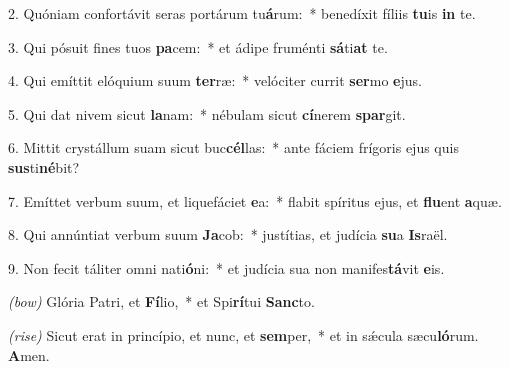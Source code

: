 2. Quóniam confortávit seras portárum tu\textbf{á}rum:~* benedíxit fíliis \textbf{tu}is \textbf{in} te.

3. Qui pósuit fines tuos \textbf{pa}cem:~* et ádipe fruménti \textbf{sá}ti\textbf{at} te.

4. Qui emíttit elóquium suum \textbf{ter}ræ:~* velóciter currit \textbf{ser}mo \textbf{e}jus.

5. Qui dat nivem sicut \textbf{la}nam:~* nébulam sicut \textbf{cí}nerem \textbf{spar}git.

6. Mittit crystállum suam sicut buc\textbf{cél}las:~* ante fáciem frígoris ejus quis \textbf{sus}ti\textbf{né}bit?

7. Emíttet verbum suum, et liquefáciet \textbf{e}a:~* flabit spíritus ejus, et \textbf{flu}ent \textbf{a}quæ.

8. Qui annúntiat verbum suum \textbf{Ja}cob:~* justítias, et judícia \textbf{su}a \textbf{Is}raël.

9. Non fecit táliter omni nati\textbf{ó}ni:~* et judícia sua non manifes\textbf{tá}vit \textbf{e}is.

\textit{(bow)} Glória Patri, et \textbf{Fí}lio,~* et Spi\textbf{rí}tui \textbf{Sanc}to.

\textit{(rise)} Sicut erat in princípio, et nunc, et \textbf{sem}per,~* et in s\'{\ae}cula sæcu\textbf{ló}rum. \textbf{A}men.